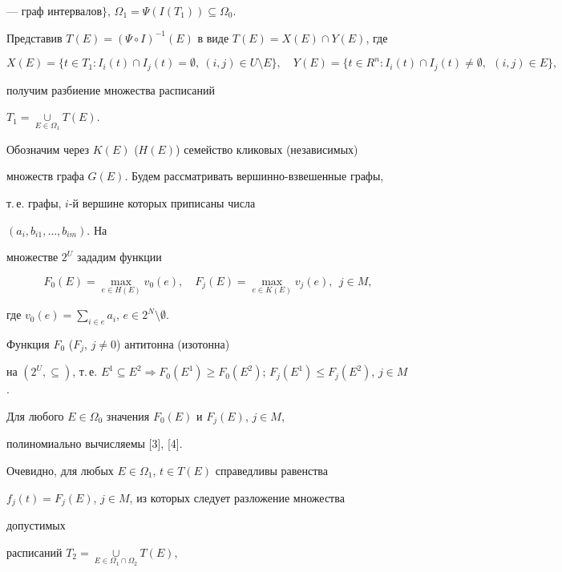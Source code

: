 --- граф интервалов$\}$, $\Omega_1=\Psi(I(T_1))\subseteq\Omega_0$. 


Представив $T(E)=(\Psi\circ I)^{-1}(E)$ в виде $T(E)=X(E)\cap Y(E)$, где 


$$ 


X(E)=\{t\in T_1:I_i(t)\cap I_j(t)=\emptyset, 


\ (i,j)\in U\setminus E\},\quad 


Y(E)=\{t\in R^n:I_i(t)\cap I_j(t)\ne\emptyset, 


\ \ (i,j)\in E\}, 


$$ 


получим разбиение множества расписаний 


$T_1=\mathop{\cup}\limits_{E\in\Omega_1}T(E)$. 


 


Обозначим через $K(E)$ ($H(E)$) семейство кликовых (независимых) 


множеств графа $G(E)$. Будем рассматривать вершинно-взвешенные графы, 


т.\,е. графы, $i$-й вершине которых приписаны числа 


$(a_i,b_{i1},\dotsc,b_{i m})$. На 


множестве $2^U$ зададим функции 


$$ 


F_0(E)=\max_{e\in H(E)}v_0(e),\quad 


F_j(E)=\max_{e\in K(E)}v_j(e),\ \ j\in M, 


$$ 


где $v_0(e)=\sum\limits_{i\in e}a_i$, $e\in2^N\setminus\emptyset$. 


Функция $F_0$ ($F_j$, $j\ne0$) антитонна (изотонна) 


на $(2^U,\subseteq)$, т.\,е. $E^1\subseteq E^2\Rightarrow F_0(E^1)\ge 


F_0(E^2)$; $F_j(E^1)\le F_j(E^2)$, $j\in M$. 


Для любого $E\in\Omega_0$ значения $F_0(E)$ и $F_j(E)$, $j\in M$, 


полиномиально вычисляемы [3], [4]. 


 


Очевидно, для любых $E\in\Omega_1$, $t\in T(E)$ справедливы равенства 


$f_j(t)=F_j(E)$, $j\in M$, из которых следует разложение множества 


допустимых 


расписаний $T_2=\mathop{\cup}\limits_{E\in\Omega_1\cap\Omega_2} T(E)$, 


